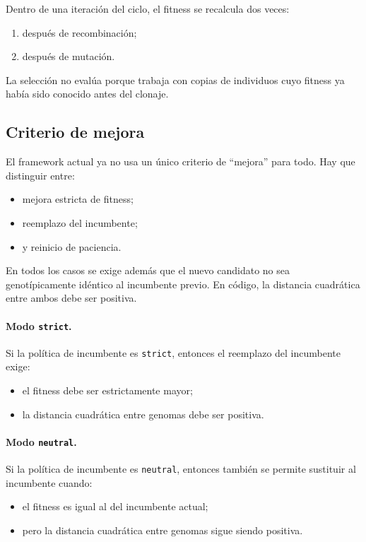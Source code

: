 \documentclass[11pt]{article}
\begin{document}
Dentro de una iteraci\'on del ciclo, el fitness se recalcula dos veces:

\begin{enumerate}
  \item despu\'es de recombinaci\'on;
  \item despu\'es de mutaci\'on.
\end{enumerate}

La selecci\'on no eval\'ua porque trabaja con copias de individuos cuyo fitness
ya hab\'ia sido conocido antes del clonaje.

\subsection{Criterio de mejora}

El framework actual ya no usa un \'unico criterio de ``mejora'' para todo.
Hay que distinguir entre:

\begin{itemize}
  \item mejora estricta de fitness;
  \item reemplazo del incumbente;
  \item y reinicio de paciencia.
\end{itemize}

En todos los casos se exige adem\'as que el nuevo candidato no sea
genot\'ipicamente id\'entico al incumbente previo. En c\'odigo, la distancia
cuadr\'atica entre ambos debe ser positiva.

\paragraph{Modo \texttt{strict}.}
Si la pol\'itica de incumbente es \texttt{strict}, entonces el reemplazo del
incumbente exige:

\begin{itemize}
  \item el fitness debe ser estrictamente mayor;
  \item la distancia cuadr\'atica entre genomas debe ser positiva.
\end{itemize}

\paragraph{Modo \texttt{neutral}.}
Si la pol\'itica de incumbente es \texttt{neutral}, entonces tambi\'en se
permite sustituir al incumbente cuando:

\begin{itemize}
  \item el fitness es igual al del incumbente actual;
  \item pero la distancia cuadr\'atica entre genomas sigue siendo positiva.
\end{itemize}
\end{document}
